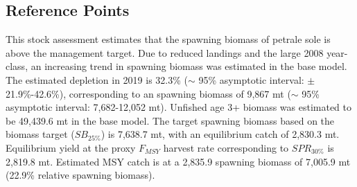 \documentclass[12pt,]{article}
\begin{document}
\subsection*{Reference Points}\label{reference-points}

This stock assessment estimates that the spawning biomass of petrale
sole is above the management target. Due to reduced landings and the
large 2008 year-class, an increasing trend in spawning biomass was
estimated in the base model. The estimated depletion in 2019 is 32.3\%
(\(\sim\) 95\% asymptotic interval: \(\pm\) 21.9\%-42.6\%),
corresponding to an spawning biomass of 9,867 mt (\(\sim\) 95\%
asymptotic interval: 7,682-12,052 mt). Unfished age 3+ biomass was
estimated to be 49,439.6 mt in the base model. The target spawning
biomass based on the biomass target (\(SB_{25\%}\)) is 7,638.7 mt, with
an equilibrium catch of 2,830.3 mt. Equilibrium yield at the proxy
\(F_{MSY}\) harvest rate corresponding to \(SPR_{30\%}\) is 2,819.8 mt.
Estimated MSY catch is at a 2,835.9 spawning biomass of 7,005.9 mt
(22.9\% relative spawning biomass).
\end{document}
